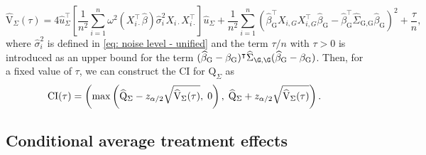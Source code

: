\begin{equation}
    \widehat{\mathrm{V}}_\Sigma(\tau) = 4 \widehat{u}_{\Sigma}^\intercal \left[\frac{1}{n^2} \sum_{i=1}^n \omega^2(X_{i\cdot}^\intercal \widehat{\beta}) \widehat{\sigma}_i^2 X_{i\cdot} X_{i\cdot}^\intercal \right] \widehat{u}_{\Sigma} + 
    \frac{1}{n^2} \sum_{i=1}^n \left(\widehat{\beta}^\intercal_{\textrm{G}} X_{i,G} X_{i,G}^\intercal \widehat{\beta}_{\textrm{G}} - \widehat{\beta}_{\textrm{G}}^\intercal \widehat{\Sigma}_{\textrm{G,G}}\widehat{\beta}_{\textrm{G}} \right)^2
    +\frac{\tau}{n},
    \label{eq: QF CI2 - unified}
\end{equation}
where $\widehat{\sigma}^2_i$ is defined in \eqref{eq: noise level - unified} and the term $\tau/n$ with $\tau > 0$ is introduced as an upper bound for the term $( \widehat{\beta}_{\textrm{G}} - \beta_{\textrm{G}} )^\intercal \widehat{\Sigma}_{\G,\G} ( \widehat{\beta}_{\textrm{G}} - \beta_{\textrm{G}} )$. 
{Then, for a fixed value of $\tau$, we can construct the CI for $\mathrm{Q}_{\Sigma}$ as 
\begin{equation}
{\rm CI}(\tau) = \left(\max\left(\widehat{\rm Q}_{\Sigma} - z_{\alpha/2}\sqrt{\widehat{\rm V}_{\Sigma}(\tau)}, \; 0\right),\; \widehat{\rm Q}_{\Sigma} + z_{\alpha/2}\sqrt{\widehat{\rm V}_{\Sigma}(\tau)}\right).
\label{eq: CI QS}
\end{equation}
}

\subsection{Conditional average treatment effects}
\label{subsec: CATE-unified}


